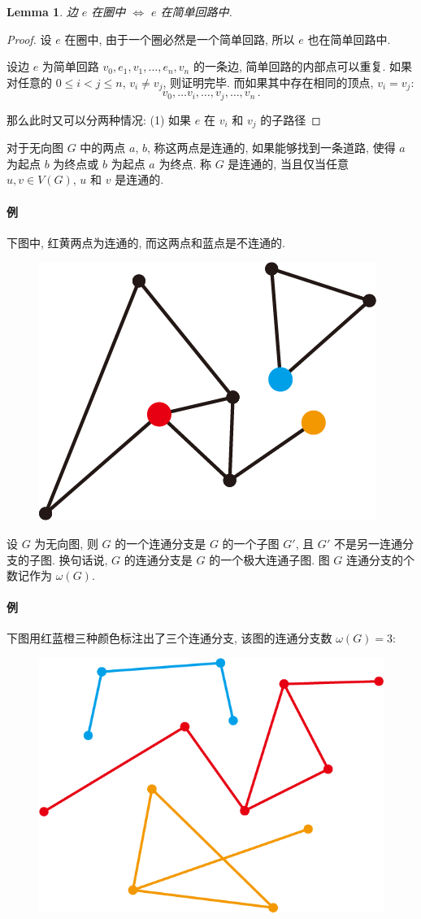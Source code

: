 \documentclass[UTF8]{ctexart}
\theoremstyle{mystyle}
\newtheorem{lemma}{Lemma}[section]
\theoremstyle{myremark}
\theoremstyle{plain}
\begin{document}
\begin{lemma}
    边 $ e $ 在圈中 $ \iff $ $ e $ 在简单回路中.
\end{lemma}

\begin{proof}
    设 $ e $ 在圈中, 由于一个圈必然是一个简单回路, 所以 $ e $ 也在简单回路中.

    设边 $ e $ 为简单回路 $ v_0, e_1, v_1, \dots, e_n, v_n $ 的一条边, 简单回路的内部点可以重复. 如果对任意的 $ 0 \leqslant i < j \leqslant n $, $ v_i \neq v_j $, 则证明完毕. 而如果其中存在相同的顶点, $ v_i = v_j $: \[ v_0, \dots v_i, \dots, v_j, \dots, v_n \,.\]
    
    那么此时又可以分两种情况: (1) 如果 $ e $ 在 $ v_i $ 和 $ v_j $ 的子路径
\end{proof}


\begin{definition}[\text{连通}]
    对于无向图 $ G $ 中的两点 $ a $, $ b $, 称这两点是连通的, 如果能够找到一条道路, 使得 $ a $ 为起点 $ b $ 为终点或 $ b $ 为起点 $ a $ 为终点. 称 $ G $ 是连通的, 当且仅当任意 $ u, v \in V(G) $, $ u $ 和 $ v $ 是连通的.
\end{definition}

\paragraph{例}
下图中, 红黄两点为连通的, 而这两点和蓝点是不连通的.
\begin{figure}[H]
    \centering
    \includegraphics[width = 0.25\linewidth]{./images/connected_1.png}
\end{figure}


\begin{definition}
    设 $ G $ 为无向图, 则 $ G $ 的一个连通分支是 $ G $ 的一个子图 $ G' $, 且 $ G' $ 不是另一连通分支的子图. 换句话说, $ G $ 的连通分支是 $ G $ 的一个极大连通子图. 图 $ G $ 连通分支的个数记作为 $ \omega(G) $.
\end{definition}

\paragraph{例}
下图用红蓝橙三种颜色标注出了三个连通分支, 该图的连通分支数 $ \omega(G) = 3 $:
\begin{figure}[H]
    \centering
    \includegraphics[width = 0.3\linewidth]{./images/branch.png}
\end{figure}
\end{document}
